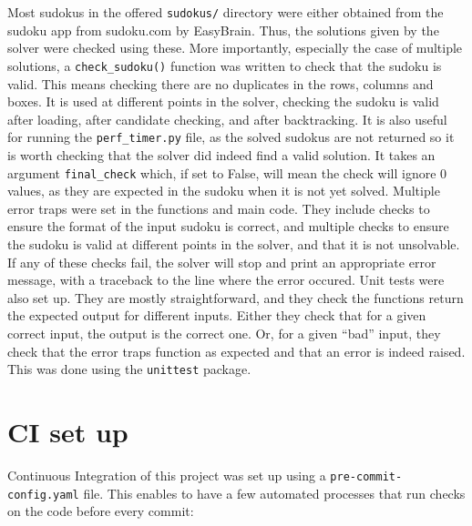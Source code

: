 \documentclass[12pt]{report} %
\begin{document}
Most sudokus in the offered \texttt{sudokus/} directory were either obtained from the sudoku app from sudoku.com\cite{sudoku_com} by EasyBrain. Thus, the solutions given by the solver were checked using these. More importantly, especially the case of multiple solutions, a \texttt{check\_sudoku()} function was written to check that the sudoku is valid. This means checking there are no duplicates in the rows, columns and boxes. It is used at different points in the solver, checking the sudoku is valid after loading, after candidate checking, and after backtracking. It is also useful for running the \texttt{perf\_timer.py} file, as the solved sudokus are not returned so it is worth checking that the solver did indeed find a valid solution. It takes an argument \texttt{final\_check} which, if set to False, will mean the check will ignore 0 values, as they are expected in the sudoku when it is not yet solved.
Multiple error traps were set in the functions and main code. They include checks to ensure the format of the input sudoku is correct, and multiple checks to ensure the sudoku is valid at different points in the solver, and that it is not unsolvable. If any of these checks fail, the solver will stop and print an appropriate error message, with a traceback to the line where the error occured.
Unit tests were also set up. They are mostly straightforward, and they check the functions return the expected output for different inputs. Either they check that for a given correct input, the output is the correct one. Or, for a given ``bad'' input, they check that the error traps function as expected and that an error is indeed raised. This was done using the \texttt{unittest} package.

\section{CI set up}

Continuous Integration of this project was set up using a \texttt{pre-commit-config.yaml} file. This enables to have a few automated processes that run checks on the code before every commit:
\end{document}
